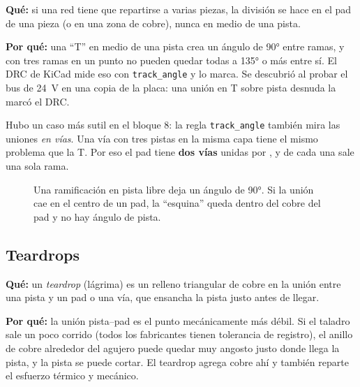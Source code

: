 \textbf{Qué:} si una red tiene que repartirse a varias piezas, la división se hace en el pad de una pieza (o en una
zona de cobre), nunca en medio de una pista.

\textbf{Por qué:} una ``T'' en medio de una pista crea un ángulo de \ang{90} entre ramas, y con tres ramas en un punto
no pueden quedar todas a \ang{135} o más entre sí. El DRC de KiCad mide eso con \texttt{track\_angle} y lo marca. Se
descubrió al probar el bus de \SI{24}{\volt} en una copia de la placa: una unión en T sobre pista desnuda la marcó el DRC.

Hubo un caso más sutil en el bloque 8: la regla \texttt{track\_angle} también mira las uniones \emph{en vías}. Una vía
con tres pistas en la misma capa tiene el mismo problema que la T. Por eso el pad  tiene \textbf{dos vías}
unidas por , y de cada una sale una sola rama.

\begin{figure}[htbp]
\centering
{}
\caption{Una ramificación en pista libre deja un ángulo de \ang{90}. Si la unión cae en el centro de un pad, la
``esquina'' queda dentro del cobre del pad y no hay ángulo de pista.}
\label{fig:c09-t}
\end{figure}

\subsection{Teardrops}

\textbf{Qué:} un \emph{teardrop} (lágrima) es un relleno triangular de cobre en la unión entre una pista y un pad o una
vía, que ensancha la pista justo antes de llegar.

\textbf{Por qué:} la unión pista--pad es el punto mecánicamente más débil. Si el taladro sale un poco corrido (todos los
fabricantes tienen tolerancia de registro), el anillo de cobre alrededor del agujero puede quedar muy angosto justo
donde llega la pista, y la pista se puede cortar. El teardrop agrega cobre ahí y también reparte el esfuerzo térmico y
mecánico.

